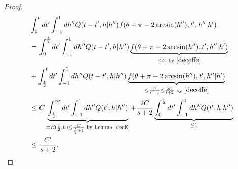\documentclass[a4paper,10pt,reqno]{amsart}
\numberwithin{equation}{subsection}
\numberwithin{figure}{subsection}
\begin{document}
\begin{proof}
\begin{align*}
&\int_0^tdt'\int_{-1}^1dh''Q(t-t',h|h'')f(\theta+\pi-2\arcsin(h''),t',h''|h')
\\
&=\int_0^{\frac{t}{2}}dt'\int_{-1}^1dh''Q(t-t',h|h'')\underbrace{f(\theta+\pi-2\arcsin(h''),t',h''|h')}_{\leq C\textrm{ by }\eqref{deceffe}}
\\
&+\int_{\frac{t}{2}}^tdt'\int_{-1}^1dh''Q(t-t',h|h'')\underbrace{f(\theta+\pi-2\arcsin(h''),t',h''|h')}_{\leq \frac{C}{t'+1}\leq\frac{2C}{t+2}\textrm{ by }\eqref{deceffe}}
\\
&\leq C\underbrace{\int_{\frac{t}{2}}^{\infty}dt'\int_{-1}^1dh''Q(t',h|h'')}_{=E(\frac{t}{2},h)\leq\frac{C}{\frac{t}{2}+1}\textrm{ by Lemma \ref{decE}}}+\frac{2C}{s+2}\underbrace{\int_0^{\frac{t}{2}}dt'\int_{-1}^1dh''Q(t',h|h'')}_{\leq1}
\\
&\leq\frac{C'}{s+2}.
\end{align*}

\end{proof}
\end{document}
